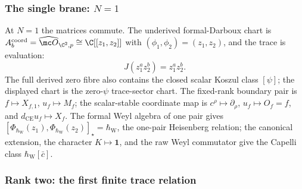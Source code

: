 \documentclass[11pt]{memoir}
\begin{document}
\subsubsection{The single brane: \texorpdfstring{$N=1$}{N=1}}\label{sssec:ex-heisenberg}

At $N=1$ the matrices commute.  The underived formal-Darboux chart is
\(A_b^{\mathrm{coord}}=\widehat{\mc O}_{\C^2,p}\cong\C[[z_1,z_2]]\) with
$(\phi_1,\phi_2)=(z_1,z_2)$, and the trace is evaluation:
\[
  J(z_1^a z_2^b)=z_1^a z_2^b .
\]
The full derived zero fibre also contains the closed scalar Koszul
class \([\psi]\); the displayed chart is the zero-\(\psi\)
trace-sector chart.
The fixed-rank boundary pair is
\(f\mapsto X_{f,1}\), \(u_f\mapsto M_f\); the scalar-stable coordinate
map is \(c^\rho\mapsto\partial_\rho\), \(u_f\mapsto O_f=f\), and
\(d_{\mathrm{CE}}u_f\mapsto X_f\).  The formal Weyl algebra of
one pair gives
$[\Phi_{\hbar_{\mathrm{W}}}(z_1),
\Phi_{\hbar_{\mathrm{W}}}(z_2)]_\star=\hbar_{\mathrm{W}}$, the one-pair
Heisenberg relation; the canonical extension, the character
\(K\mapsto\mathbf1\), and the raw Weyl commutator give the Capelli class
\(\hbar_{\mathrm{W}}[\bar c]\).

\subsubsection{Rank two: the first finite trace relation}\label{sssec:ex-N2-finite-window}
\end{document}
